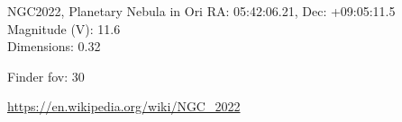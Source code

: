 \begin{block}{NGC2022, Planetary Nebula in Ori}
    RA: 05:42:06.21, Dec: +09:05:11.5 \\ 
    Magnitude (V): 11.6 \\ 
    Dimensions: 0.32 

    Finder fov: 30 

    \url{https://en.wikipedia.org/wiki/NGC_2022} 
\end{block}